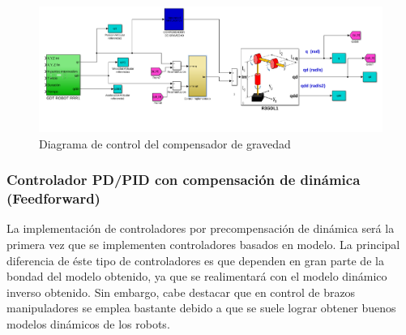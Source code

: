 \begin{figure}[h!]
	\centering
	\includegraphics[width=.8\textwidth]{montaje_grav}
	\caption{Diagrama de control del compensador de gravedad}
\end{figure}

	\subsubsection{Controlador PD/PID con compensación de dinámica (Feedforward)}
	La implementación de controladores por precompensación de dinámica será la primera vez que se implementen controladores basados en modelo. La principal diferencia de éste tipo de controladores es que dependen en gran parte de la bondad del modelo obtenido, ya que se realimentará con el modelo dinámico inverso obtenido. Sin embargo, cabe destacar que en control de brazos manipuladores se emplea bastante debido a que se suele lograr obtener buenos modelos dinámicos de los robots.\\


